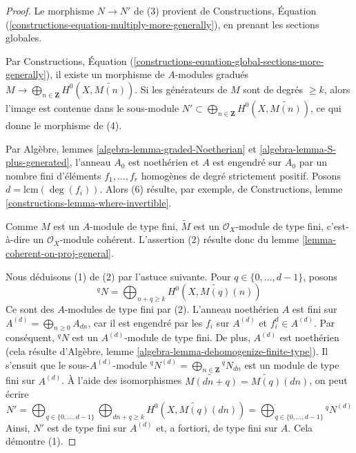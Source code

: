 \begin{proof}
Le morphisme $N \to N'$ de (3) provient de
Constructions, Équation (\ref{constructions-equation-multiply-more-generally}),
en prenant les sections globales.

\medskip\noindent
Par
Constructions, Équation
(\ref{constructions-equation-global-sections-more-generally}),
il existe un morphisme de $A$-modules gradués
$M \to \bigoplus_{n \in \mathbf{Z}} H^0(X, \widetilde{M(n)})$.
Si les générateurs de $M$ sont de degrés $\geq k$, alors l'image est
contenue dans le sous-module
$N' \subset \bigoplus_{n \in \mathbf{Z}} H^0(X, \widetilde{M(n)})$,
ce qui donne le morphisme de (4).

\medskip\noindent
Par Algèbre, lemmes \ref{algebra-lemma-graded-Noetherian} et
\ref{algebra-lemma-S-plus-generated}, l'anneau $A_0$ est noethérien
et $A$ est engendré sur $A_0$ par un nombre fini d'éléments
$f_1, \ldots, f_r$ homogènes de degré strictement positif.
Posons $d = \text{lcm}(\deg(f_i))$. Alors (6) résulte, par
exemple, de Constructions,
lemme \ref{constructions-lemma-where-invertible}.

\medskip\noindent
Comme $M$ est un $A$-module de type fini,
$\widetilde{M}$ est un $\mathcal{O}_X$-module de
type fini, c'est-à-dire un $\mathcal{O}_X$-module
cohérent. L'assertion (2) résulte donc du lemme \ref{lemma-coherent-on-proj-general}.

\medskip\noindent
Nous déduisons (1) de (2) par l'astuce suivante. Pour $q \in \{0, \ldots, d - 1\}$,
posons
$$
{}^qN = \bigoplus\nolimits_{n + q \geq k} H^0(X, \widetilde{M(q)}(n))
$$
Ce sont des $A$-modules de type fini par (2). L'anneau noethérien $A$
est fini sur $A^{(d)} = \bigoplus_{n \geq 0} A_{dn}$, car
il est engendré par les $f_i$ sur $A^{(d)}$ et $f_i^d \in A^{(d)}$. Par
conséquent, ${}^qN$ est un $A^{(d)}$-module de type
fini. De plus, $A^{(d)}$ est noethérien (cela résulte
d'Algèbre, lemme \ref{algebra-lemma-dehomogenize-finite-type}).
Il s'ensuit que le sous-$A^{(d)}$-module
${}^qN^{(d)} = \bigoplus_{n \in \mathbf{Z}} {}^qN_{dn}$
est un module de type fini sur $A^{(d)}$. À l'aide des isomorphismes
$\widetilde{M(dn + q)} = \widetilde{M(q)}(dn)$, on peut écrire
$$
N' =
\bigoplus\nolimits_{q \in \{0, \ldots, d - 1\}}
\bigoplus\nolimits_{dn + q \geq k}
H^0(X, \widetilde{M(q)}(dn)) =
\bigoplus\nolimits_{q \in \{0, \ldots, d - 1\}} {}^qN^{(d)}
$$
Ainsi, $N'$ est de type fini sur $A^{(d)}$ et, a fortiori, de type fini sur $A$.
Cela démontre (1).


\end{proof}
